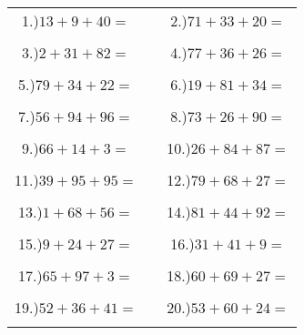 \documentclass{article}
\begin{document}
\begin{tabular}{ccc}
1.)$13+9+40=$& \hspace{5cm} &2.)$71+33+20=$\\\\
3.)$2+31+82=$& \hspace{5cm} &4.)$77+36+26=$\\\\
5.)$79+34+22=$& \hspace{5cm} &6.)$19+81+34=$\\\\
7.)$56+94+96=$& \hspace{5cm} &8.)$73+26+90=$\\\\
9.)$66+14+3=$& \hspace{5cm} &10.)$26+84+87=$\\\\
11.)$39+95+95=$& \hspace{5cm} &12.)$79+68+27=$\\\\
13.)$1+68+56=$& \hspace{5cm} &14.)$81+44+92=$\\\\
15.)$9+24+27=$& \hspace{5cm} &16.)$31+41+9=$\\\\
17.)$65+97+3=$& \hspace{5cm} &18.)$60+69+27=$\\\\
19.)$52+36+41=$& \hspace{5cm} &20.)$53+60+24=$\\\\
\end{tabular}
\newpage
\end{document}
